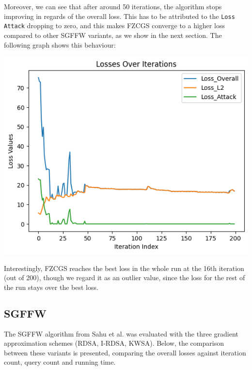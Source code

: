 \documentclass[10pt,twocolumn,letterpaper]{article}
\begin{document}
Moreover, we can see that after around 50 iterations, the algorithm stops 
improving in regards of the overall loss. This has to be attributed to the \texttt{Loss Attack} dropping
to zero, and this makes FZCGS converge to a higher loss compared to other SGFFW variants, as we show in the next section.
The following graph shows this behaviour:

\begin{center}
   \includegraphics*[scale=0.45]{img/FZCGS_Losses.png}
\end{center}

Interestingly, FZCGS reaches the best loss in the whole run at the 16th iteration (out of 200), though
we regard it as an outlier value, since the loss for the rest of the run stays over the best loss.



\subsection{SGFFW}

The SGFFW algorithm from Sahu et al. was evaluated with the three
gradient approximation schemes (RDSA, I-RDSA, KWSA).
Below, the comparison between these variants is presented,
comparing the overall losses against iteration count, query count and running time.
\end{document}
